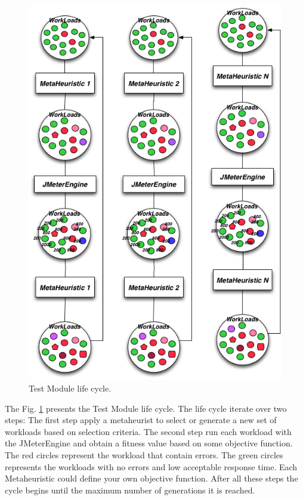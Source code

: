 \begin{figure}[h]
\begin{minipage}{.5\textwidth}
\centering
\includegraphics[width=1\textwidth]{./images/step2.png}
\caption{Test Module life cycle.}
\label{fig:step2}
\end{minipage}
\end{figure} 

The Fig. \ref{fig:step2} presents the Test Module life cycle. The life cycle iterate over two steps: The first step apply a metaheurist to select or generate a new set of workloads based on selection criteria. The second step run each workload with the JMeterEngine and obtain a fitness value based on some objective function. The red circles represent the workload that contain errors. The green circles represents the workloads with no errors and low acceptable response time.  Each Metaheuristic could define your own objective function. After all these steps the cycle begins until the maximum number of generations it is reached. 

